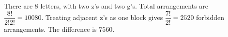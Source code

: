 There are 8 letters, with two z's and two g's. Total arrangements are $\dfrac{8!}{2!2!}=10080$. Treating adjacent z's as one block gives $\dfrac{7!}{2!}=2520$ forbidden arrangements. The difference is $\boxed{7560}$.
